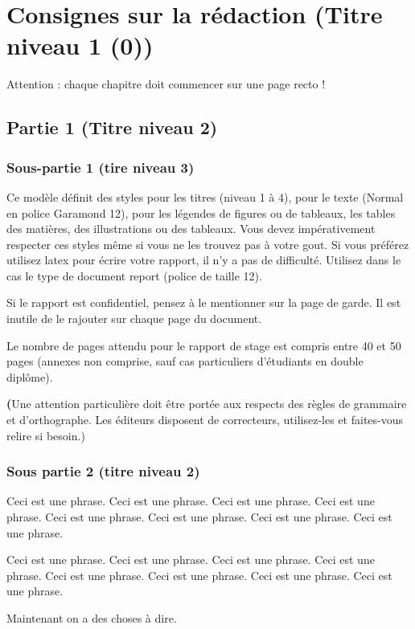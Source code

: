 
\chapter{Consignes sur la rédaction (Titre niveau 1 (0))}
Attention : chaque chapitre doit commencer sur une page recto !

\section{Partie 1 (Titre niveau 2)}
\subsection{Sous-partie 1 (tire niveau 3)}

Ce modèle définit des styles pour les titres (niveau 1 à 4), pour le texte (Normal en police Garamond 12), pour les légendes de figures ou de tableaux, les tables des matières, des illustrations ou des tableaux. Vous devez impérativement respecter ces styles même si vous ne les trouvez pas à votre gout. 
Si vous préférez utilisez latex pour écrire votre rapport, il n’y a pas de difficulté. Utilisez dans le cas le type de document report (police de taille 12).

Si le rapport est confidentiel, pensez à le mentionner sur la page de garde. Il est inutile de le rajouter sur chaque page du document.

Le nombre de pages attendu pour le rapport de stage est compris entre 40 et 50 pages (annexes non comprise, sauf cas particuliers d’étudiants en double diplôme).

\textbf(Une attention particulière doit être portée aux respects des règles de grammaire et d’orthographe. Les éditeurs disposent de correcteurs, utilisez-les et faites-vous relire si besoin.)

\subsection{Sous partie 2 (titre niveau 2)}

Ceci est une phrase. Ceci est une phrase. Ceci est une phrase. Ceci est une phrase. Ceci est une phrase. Ceci est une phrase. Ceci est une phrase. Ceci est une phrase.

Ceci est une phrase. Ceci est une phrase. Ceci est une phrase. Ceci est une phrase. Ceci est une phrase. Ceci est une phrase. Ceci est une phrase. Ceci est une phrase.

Maintenant on a des choses à dire.

